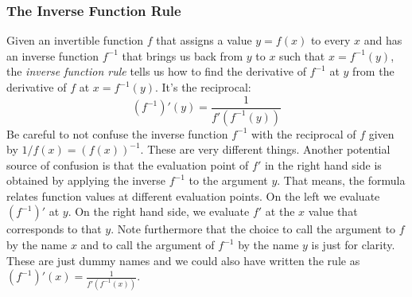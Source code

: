 

\subsubsection{The Inverse Function Rule}
Given an invertible function $f$ that assigns a value $y = f(x)$ to every $x$ and has an inverse function  $f^{-1}$ that brings us back from $y$ to $x$ such that $x = f^{-1}(y)$, the \emph{inverse function rule} tells us how to find the derivative of  $f^{-1}$ at $y$ from the derivative of $f$ at $x = f^{-1}(y)$. It's the reciprocal:
\begin{equation}
 (f^{-1})'(y) = \frac{1}{f'(f^{-1}(y))}
\end{equation}
Be careful to not confuse the inverse function $f^{-1}$ with the reciprocal of $f$ given by $1/f(x) = (f(x))^{-1}$. These are very different things. Another potential source of confusion is that the evaluation point of $f'$ in the right hand side is obtained by applying the inverse $f^{-1}$ to the argument $y$. That means, the formula relates function values at different evaluation points. On the left we evaluate $(f^{-1})'$ at $y$. On the right hand side, we evaluate $f'$ at the $x$ value that corresponds to that $y$. Note furthermore that the choice to call the argument to $f$ by the name $x$ and to call the argument of $f^{-1}$ by the name $y$ is just for clarity. These are just dummy names and we could also have written the rule as $(f^{-1})'(x) = \frac{1}{f'(f^{-1}(x))}$. 








